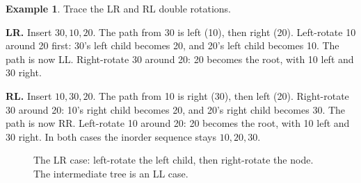 \documentclass[11pt]{article}
\theoremstyle{definition}
\newtheorem{example}{Example}[section]
\begin{document}
\begin{example}
Trace the LR and RL double rotations.

\textbf{LR.} Insert $30,10,20$. The path from 30 is left (10), then right
(20). Left-rotate 10 around 20 first: 30's left child becomes 20, and 20's
left child becomes 10. The path is now LL. Right-rotate 30 around 20: 20
becomes the root, with 10 left and 30 right.

\textbf{RL.} Insert $10,30,20$. The path from 10 is right (30), then left
(20). Right-rotate 30 around 20: 10's right child becomes 20, and 20's right
child becomes 30. The path is now RR. Left-rotate 10 around 20: 20 becomes
the root, with 10 left and 30 right. In both cases the inorder sequence stays
$10,20,30$.
\end{example}

\begin{figure}[h]
  \centering
  \caption{The LR case: left-rotate the left child, then right-rotate the
    node. The intermediate tree is an LL case.}
  \label{fig:lr}
\end{figure}
\end{document}
